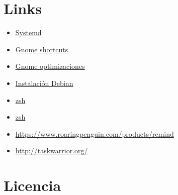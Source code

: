 \documentclass[12pt,spanish,]{scrartcl}
\providecommand{\tightlist}{%
  \setlength{\itemsep}{0pt}\setlength{\parskip}{0pt}}
\begin{document}
\section{Links}\label{links}

\begin{itemize}
\tightlist
\item
  \href{https://wiki.debian.org/systemd}{Systemd}
\item
  \href{https://wiki.gnome.org/Design/OS/KeyboardShortcuts}{Gnome
  shortcuts}
\item
  \href{https://www.linux.com/learn/easy-steps-make-gnome-3-more-efficient}{Gnome
  optimizaciones}
\item
  \href{https://diversidadyunpocodetodo.blogspot.com.es/2015/03/sensores-temperatura-hardware-discos-cpu-debian-ubuntu.html}{Instalación
  Debian}
\item
  \href{http://joshldavis.com/2014/07/26/oh-my-zsh-is-a-disease-antigen-is-the-vaccine/}{zsh}
\item
  \href{http://blog.namangoel.com/zsh-with-antigen}{zsh}
\item
  \url{https://www.roaringpenguin.com/products/remind}
\item
  \url{http://taskwarrior.org/}
\end{itemize}

\section{Licencia}\label{licencia}
\end{document}
